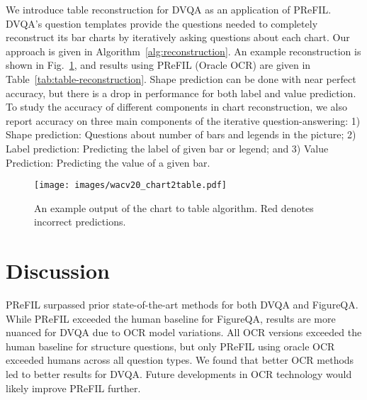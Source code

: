 \documentclass[10pt,twocolumn]{article}
\begin{document}
We introduce table reconstruction for DVQA as an application of PReFIL.  DVQA's question templates provide the questions needed to completely reconstruct its bar charts by iteratively asking questions about each chart. Our approach is given in Algorithm~\ref{alg:reconstruction}. An example reconstruction is shown in Fig.~\ref{fig:table-reconstruction-example}, and results using PReFIL (Oracle OCR) are given in Table~\ref{tab:table-reconstruction}. Shape prediction can be done with near perfect accuracy, but there is a drop in performance for both label and value prediction.  To study the accuracy of different components in chart reconstruction, we also report accuracy on three main components of the iterative question-answering: 1) Shape prediction: Questions about number of bars and legends in the picture; 2) Label prediction: Predicting the label of given bar or legend; and 3) Value Prediction: Predicting the value of a given bar. 




\begin{figure}[t!]
    \centering
\texttt{[image: images/wacv20\_chart2table.pdf]}
    \caption{An example output of the chart to table algorithm. Red denotes incorrect predictions.}
    \label{fig:table-reconstruction-example}
\end{figure}


\section{Discussion}
\label{sec:discussion}


PReFIL surpassed prior state-of-the-art methods for both DVQA and FigureQA. While PReFIL exceeded the human baseline for FigureQA, results are more nuanced for DVQA due to OCR model variations. All OCR versions  exceeded the human baseline for structure questions, but only PReFIL using oracle OCR exceeded humans across all question types. We found  that better OCR methods led to better results for DVQA. Future developments in OCR technology would likely improve PReFIL further. 
\end{document}
